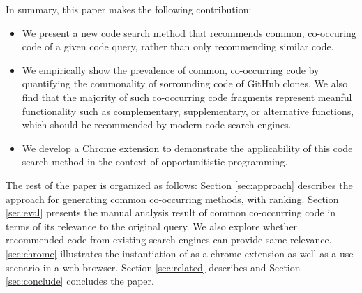 In summary, this paper makes the following contribution:
\begin{itemize}
\item We present a new code search method that recommends common, co-occuring code of a given code query, rather than only recommending similar code.
\item We empirically show the prevalence of common, co-occurring code by quantifying the commonality of sorrounding code of GitHub clones. We also find that the majority of such co-occurring code fragments represent meanful functionality such as complementary, supplementary, or alternative functions, which should be recommended by modern code search engines.
\item We develop a Chrome extension to demonstrate the applicability of this code search method in the context of opportunitistic programming.
\end{itemize}

The rest of the paper is organized as follows: Section
\ref{sec:approach} describes the approach for generating
common co-occurring methods, with ranking. Section \ref{sec:eval} presents the manual analysis result of common co-occurring code in terms of its relevance to the original query. We also explore whether recommended code from  existing search engines can provide same relevance. \ref{sec:chrome} illustrates the instantiation of {\tool} as a chrome extension as well as a use scenario in a web browser. Section \ref{sec:related} describes and Section \ref{sec:conclude} concludes the paper.
